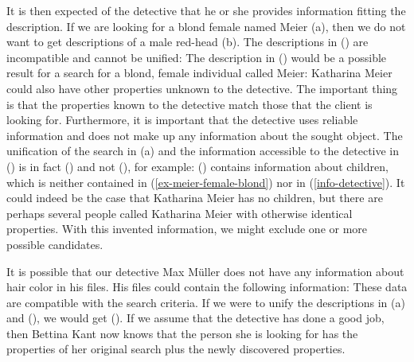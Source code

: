 It is then expected of the detective that he or she provides information fitting the description. If
we are looking for a blond female named Meier (a), then we
do not want to get descriptions of a male red-head (b). The descriptions in () are incompatible and cannot be unified:
\eal
\ex\label{ex-meier-female-blond}
\ex {}
\zl
\addlines[-1]
The description in () would be a possible result for a search for a blond, female individual called Meier:
\ea
\label{info-detective}
\z
Katharina Meier could also have other properties unknown to the detective. The important thing is that the properties known to the detective match those
that the client is looking for. Furthermore, it is important that the detective uses reliable information and does not make up any information about the sought
object. The unification of the search in (a) and the information accessible to the detective in () is in fact () and not (), for example:
\ea
{}
\z
() contains information about children, which is neither contained in
(\ref{ex-meier-female-blond}) nor in (\ref{info-detective}).
It could indeed be the case that Katharina Meier has no children, but there are perhaps several people
called Katharina Meier with otherwise identical properties. With this invented information, we might
exclude one or more possible candidates. 

It is possible that our detective Max Müller does not have any information about hair color in his
files. His files could contain the following information:
\ea
{}
\z
These data are compatible with the search criteria. If we were to unify the descriptions in (a) and (), we would get ().
If we assume that the detective has done a good job, then Bettina Kant now knows that the person she is looking for has the properties of her
original search plus the newly discovered properties.

